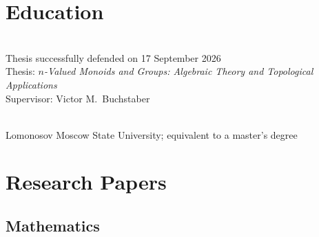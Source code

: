 \documentclass[11pt,letterpaper]{report}
\begin{document}
    \section*{Education}

    \begin{tablist}

        \item[2022 -- 2026]  \\ {Thesis successfully defended on 17 September 2026\\
Thesis: \textit{$n$-Valued Monoids and Groups: Algebraic Theory and Topological Applications}\\
Supervisor: Victor M.~Buchstaber}

        \item[Sep. 2016 -- May 2022]  \\ {Lomonosov Moscow State University; equivalent to a master's degree} 

    \end{tablist}
    
    
    
    
    
    \section*{Research Papers}
    
      \subsection*{Mathematics}
\end{document}
